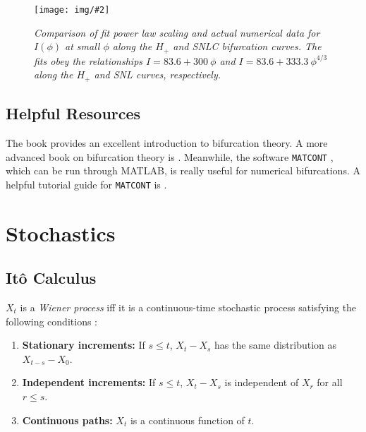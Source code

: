 \documentclass[letterpaper,12pt]{article}
\numberwithin{table}{section}
\numberwithin{figure}{section}
\numberwithin{equation}{section}
\newcommand{\centerfig}[2]{\begin{center}\texttt{[image: img/\#2]}\end{center}}
\newcommand{\ccaption}[1]{\caption{\textit{#1}}}
\begin{document}
\begin{flushleft}
\begin{figure}[!h]
        \centering
 
        \centerfig{0.8}{bif-scale.jpg}
    
        \captionsetup{width=0.8\linewidth}
        \ccaption{Comparison of fit power law scaling and actual numerical data for $I(\phi)$ at small $\phi$ along the $H_+$ and SNLC bifurcation curves. The fits obey the relationships $I = 83.6 + 300 \: \phi$ and $I = 83.6 + 333.3 \: \phi^{4/3}$ along the $H_+$ and SNL curves, respectively.}
        \label{fig:bif-scale}
    
    \end{figure}

    \subsection{Helpful Resources}
    The book \cite{strogatz} provides an excellent introduction to bifurcation theory. A more advanced book on bifurcation theory is \cite{kuznetsov}. Meanwhile, the software \texttt{MATCONT} \cite{matcont}, which can be run through MATLAB, is really useful for numerical bifurcations. A helpful tutorial guide for \texttt{MATCONT} is \cite{matcont-tut}.

    \pagebreak

    \section{Stochastics}

    \subsection{It\^o Calculus}

    $X_t$ is a \textit{Wiener process} iff it is a continuous-time stochastic process satisfying the following conditions \cite{finbook}:
    \begin{enumerate}
        \item \textbf{Stationary increments:} If $s \leq t$, $X_t - X_s$ has the same distribution as $X_{t-s} - X_0$.
        \item \textbf{Independent increments:} If $s \leq t$, $X_t - X_s$ is independent of $X_r$ for all $r \leq s$.
        \item \textbf{Continuous paths:} $X_t$ is a continuous function of $t$.
    \end{enumerate}


\end{flushleft}
\end{document}
